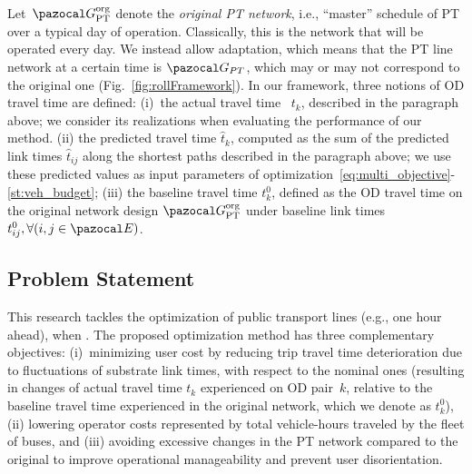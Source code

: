 \documentclass[a4paper,fleqn]{cas-sc}
\begin{document}
Let~$\pazocal G_\text{PT}^\text{org}$ denote the \emph{original PT network}, i.e., ``master'' schedule of PT over a typical day of operation. Classically, this is the network that will be operated every day. We instead allow adaptation, which means that the PT line network at a certain time is $\pazocal G_{PT}$, which may or may not correspond to the original one (Fig.~\ref{fig:rollFramework}).
%
In our framework, three notions of OD travel time are defined:
(i)~the actual travel time ~$t_k$, described in the paragraph above; we consider its realizations when evaluating the performance of our method.
(ii) the predicted travel time $\hat t_k$, computed as the sum of the predicted link times $\hat t_{ij}$ along the shortest paths described in the paragraph above; we use these predicted values as input parameters of optimization~\eqref{eq:multi_objective}-\eqref{st:veh_budget};
(iii) the baseline travel time $t_k^0$, defined as the OD travel time on the original network design $\pazocal G_\text{PT}^\text{org}$ under baseline link times $t_{ij}^0,\forall (i,j\in\pazocal E)$.
\subsection{Problem Statement}\label{sec:problemStatement}
This research tackles the optimization of public transport lines (e.g., one hour ahead),  when .
%
The proposed optimization method has three complementary objectives: 
(i)~minimizing user cost by reducing trip travel time deterioration due to fluctuations of substrate link times, with respect to the nominal ones (resulting in changes of actual travel time $t_k$ experienced on OD pair~$k$, relative to the baseline travel time experienced in the original network, which we denote as $t_k^0$), 
(ii) lowering operator costs represented by total vehicle-hours traveled by the fleet of buses, and (iii) avoiding excessive changes in the PT network compared to the original to improve operational manageability and prevent user disorientation.
\end{document}
